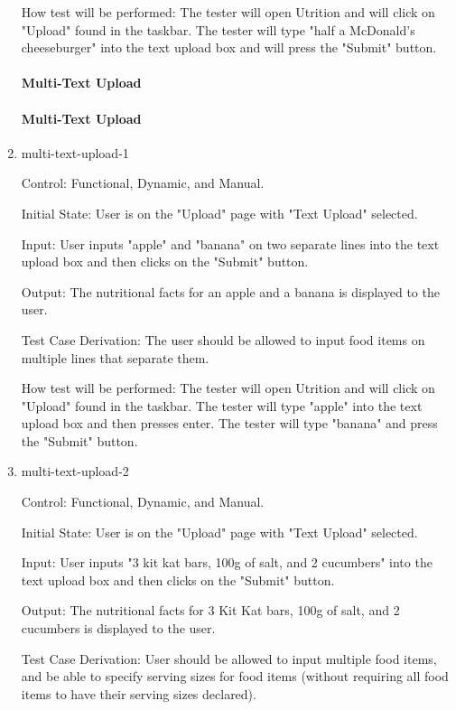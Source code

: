 \documentclass[12pt, titlepage]{article}
\begin{document}
\begin{enumerate}
	How test will be performed: The tester will open Utrition and will click on "Upload" found in the taskbar. The tester will type "half a McDonald's cheeseburger" into the text upload box and will press the "Submit" button.
	
	\paragraph{Multi-Text Upload}
	\paragraph{Multi-Text Upload}
	
	\item{multi-text-upload-1\\}
	
	Control: Functional, Dynamic, and Manual.
	
	Initial State: User is on the "Upload" page with "Text Upload" selected.
	
	Input: User inputs "apple" and "banana" on two separate lines into the text upload box and then clicks on the "Submit" button.
	
	Output: The nutritional facts for an apple and a banana is displayed to the user.
	
	Test Case Derivation: The user should be allowed to input food items on multiple lines that separate them.
	
	How test will be performed: The tester will open Utrition and will click on "Upload" found in the taskbar. The tester will type "apple" into the text upload box and then presses enter. The tester will type "banana" and press the "Submit" button.
	
	\item{multi-text-upload-2\\}
	
	Control: Functional, Dynamic, and Manual.
	
	Initial State: User is on the "Upload" page with "Text Upload" selected.
	
	Input: User inputs "3 kit kat bars, 100g of salt, and 2 cucumbers" into the text upload box and then clicks on the "Submit" button.
	
	Output: The nutritional facts for 3 Kit Kat bars, 100g of salt, and 2 cucumbers is displayed to the user.
	
	Test Case Derivation: User should be allowed to input multiple food items, and be able to specify serving sizes for food items (without requiring all food items to have their serving sizes declared).
	

\end{enumerate}
\end{document}
